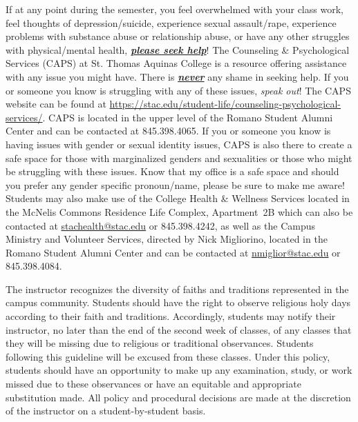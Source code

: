 \documentclass[11pt,letterpaper]{article}
\begin{document}
If at any point during the semester, you feel overwhelmed with your class work, feel thoughts of depression/suicide, experience sexual assault/rape, experience problems with substance abuse or relationship abuse, or have any other struggles with physical/mental health, \underline{\bfseries\itshape please seek help}! The Counseling \& Psychological Services (CAPS) at St. Thomas Aquinas College is a resource offering assistance with any issue you might have. There is \underline{\bfseries\itshape never} any shame in seeking help. If you or someone you know is struggling with any of these issues, {\itshape speak out}! The CAPS website can be found at \href{https://stac.edu/student-life/counseling-psychological-services/}{https://stac.edu/student-life/counseling-psychological-services/}. CAPS is located in the upper level of the Romano Student Alumni Center and can be contacted at 845.398.4065. If you or someone you know is having issues with gender or sexual identity issues, CAPS is also there to create a safe space for those with marginalized genders and sexualities or those who might be struggling with these issues. Know that my office is a safe space and should you prefer any gender specific pronoun/name, please be sure to make me aware! Students may also make use of the College Health \& Wellness Services located in the McNelis Commons Residence Life Complex, Apartment~2B which can also be contacted at \href{mailto:stachealth@stac.edu}{stachealth@stac.edu} or 845.398.4242, as well as the Campus Ministry and Volunteer Services, directed by Nick Migliorino, located in the Romano Student Alumni Center and can be contacted at \href{mailto:nmiglior@stac.edu}{nmiglior@stac.edu} or 845.398.4084.
\pspace



The instructor recognizes the diversity of faiths and traditions represented in the campus community. Students should have the right to observe religious holy days according to their faith and traditions. Accordingly, students may notify their instructor, no later than the end of the second week of classes, of any classes that they will be missing due to religious or traditional observances. Students following this guideline will be excused from these classes. Under this policy, students should have an opportunity to make up any examination, study, or work missed due to these observances or have an equitable and appropriate substitution made. All policy and procedural decisions are made at the discretion of the instructor on a student-by-student basis. 
\pspace
\end{document}
